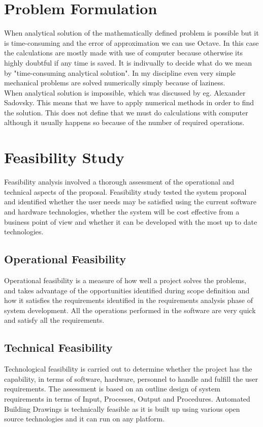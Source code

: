 
\section{Problem Formulation}
 When analytical solution of the mathematically defined problem is possible but it is time-consuming and the error of approximation we can use Octave. In this case the calculations are mostly made with use of computer because otherwise its highly doubtful if any time is saved. It is indivually to decide what do we mean by "time-consuming analytical solution". In my discipline even very simple mechanical problems are solved numerically simply because of laziness. \\
\noindent When analytical solution is impossible, which was discussed by eg. Alexander Sadovsky. This means that we have to apply numerical methods in order to find the solution. This does not define that we must do calculations with computer although it usually happens so because of the number of required operations.


\section{Feasibility Study}
\noindent Feasibility analysis involved a thorough assessment of the operational and technical aspects of the proposal.
Feasibility study tested the system proposal and identified whether the user needs may be satisfied using
the current software and hardware technologies, whether the system will be cost effective from a business
point of view and whether it can be developed with the most up to date technologies.
\subsection{Operational Feasibility}
\noindent Operational feasibility is a measure of how well a project solves the problems, and takes advantage of
the opportunities identified during scope definition and how it satisfies the requirements identified in
the requirements analysis phase of system development. All the operations performed in the software
are very quick and satisfy all the requirements.
\subsection{Technical Feasibility}
\noindent Technological feasibility is carried out to determine whether the project has the capability, in terms
of software, hardware, personnel to handle and fulfill the user requirements. The assessment is based
on an outline design of system requirements in terms of Input, Processes, Output and Procedures.
Automated Building Drawings is technically feasible as it is built up using various open source technologies and it can run on any platform.
